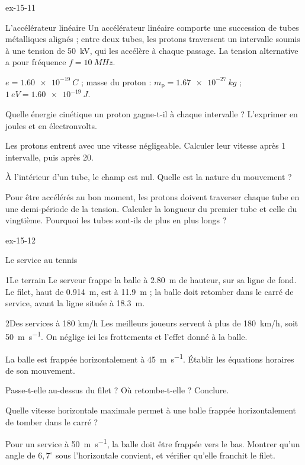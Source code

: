 \begin{blocLivre}{ex-15-11}
\begin{exercice}[2]{L'accélérateur linéaire}
Un accélérateur linéaire comporte une succession de tubes métalliques alignés ; entre deux tubes, les protons traversent
un intervalle soumis à une tension de \qty{50}{kV}, qui les accélère à chaque passage. La tension alternative a pour
fréquence $f=\qty{10}{MHz}$.
\begin{donnees}
$e=\qty{1,60e-19}{C}$ ; masse du proton : $m_\mathrm{p}=\qty{1,67e-27}{kg}$ ; $\qty{1}{eV}=\qty{1,60e-19}{J}$.
\end{donnees}
\begin{questions}
\item Quelle énergie cinétique un proton gagne-t-il à chaque intervalle ? L'exprimer en joules et en électronvolts.
\item Les protons entrent avec une vitesse négligeable. Calculer leur vitesse après 1 intervalle, puis après 20.
\item À l'intérieur d'un tube, le champ est nul. Quelle est la nature du mouvement ?
\item Pour être accélérés au bon moment, les protons doivent traverser chaque tube en une demi-période de la tension.
Calculer la longueur du premier tube et celle du vingtième. Pourquoi les tubes sont-ils de plus en plus longs ?
\end{questions}
\end{exercice}
\end{blocLivre}
\begin{blocLivre}{ex-15-12}
\begin{exercice}[3]{Le service au tennis}
\begin{docu}{1}{Le terrain}
Le serveur frappe la balle à \qty{2,80}{m} de hauteur, sur sa ligne de fond. Le filet, haut de \qty{0,914}{m}, est à
\qty{11,9}{m} ; la balle doit retomber dans le carré de service, avant la ligne située à \qty{18,3}{m}.
\end{docu}
\begin{docu}{2}{Des services à 180 km/h}
Les meilleurs joueurs servent à plus de 180~km/h, soit \qty{50}{m.s^{-1}}. On néglige ici les frottements et l'effet
donné à la balle.
\end{docu}
\begin{questions}
\item La balle est frappée horizontalement à \qty{45}{m.s^{-1}}. Établir les équations horaires de son mouvement.
\item Passe-t-elle au-dessus du filet ? Où retombe-t-elle ? Conclure.
\item Quelle vitesse horizontale maximale permet à une balle frappée horizontalement de tomber dans le carré ?
\item \initiative Pour un service à \qty{50}{m.s^{-1}}, la balle doit être frappée vers le bas. Montrer qu'un angle de
$6{,}7^\circ$ sous l'horizontale convient, et vérifier qu'elle franchit le filet.
\end{questions}
\end{exercice}
\end{blocLivre}
